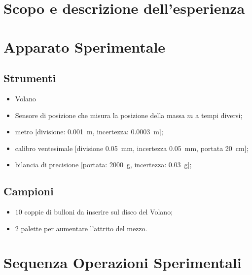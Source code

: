\documentclass[10pt,oneside,a4paper]{article}
\begin{document}
\section{Scopo e descrizione dell'esperienza}
\label{sec:descrizione}



\section{Apparato Sperimentale}
\subsection{Strumenti}
\label{subsec:strumenti}

\begin{itemize}
	\item Volano 
	\item Sensore di posizione che misura la posizione della massa $m$ a tempi diversi;
	\item metro [divisione: \SI{0.001}{m}, incertezza: \SI{0.0003}{m}];
	\item calibro ventesimale [divisione \SI{0,05}{mm}, incertezza \SI{0,05}{mm}, portata \SI{20}{cm}];
	\item bilancia di precisione [portata: \SI{2000}{g}, incertezza: \SI{0.03}{g}];
\end{itemize}
\subsection{Campioni}
\begin{itemize}
	\item $10$ coppie di bulloni da inserire sul disco del Volano; 
	\item $2$ palette per aumentare l'attrito del mezzo.
\end{itemize}

\section{Sequenza Operazioni Sperimentali} 

\end{document}
